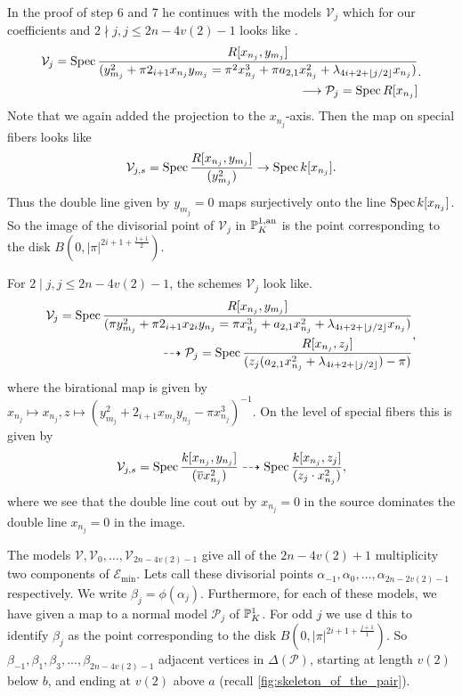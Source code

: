 In the proof of step 6 and 7 he continues with the models $\mathcal{V} _j$ which for our coefficients and $2 \nmid j, j\le 2n - 4v(2) - 1$ looks like . 
\[
	\begin{aligned}
	\mathcal{V} _j = \operatorname{Spec} \frac{R[x_{n_{j}}, y_{m_j}]}{(y_{m_j}^2 + \pi 2_{i + 1} x_{n_j}y_{m_j} = \pi^2 x_{n_j}^3 + \pi a_{2, 1} x_{n_j}^2 + \lambda_{4i + 2 + \left\lfloor j / 2 \right\rfloor} x_{n_j}) } \\ 
	\longrightarrow  \mathcal{P} _{j} = \operatorname{Spec} R[x_{n_j}]
	\end{aligned}
.\] 
Note that we again added the projection to the $x_{n_j}$-axis. 
Then the map on special fibers looks like \[
	\mathcal{V} _{j, s} = \operatorname{Spec} \frac{R[x_{n_j}, y_{m_j}]}{(y_{m_j}^2)} \to \operatorname{Spec} k[x_{n_j}]
.\] 
Thus the double line given by $y_{m_j} = 0$ maps surjectively onto the line $\operatorname{Spec} k[x_{n_j}]$. 
So the image of the divisorial point of $\mathcal{V} _j$ in $\mathbb{P}^{1, \text{an}}_K$ is the point corresponding to the disk $B(0, |\pi|^{2i + 1 + \frac{j + 1}{2}})$. 

For $2 \mid j, j \le 2n - 4v(2) - 1$, the schemes $\mathcal{V} _j$ look like. 
\[
	\begin{aligned}
		\mathcal{V}_j = \operatorname{Spec} \frac{R[x_{n_j},y_{m_j}]}{(\pi y^2_{m_j} + \pi 2_{{i + 1}}x_{2i}y_{n_j} = \pi x_{n_j}^3 + a_{2,1}x_{n_j}^2 + \lambda_{4i + 2 + \left\lfloor j / 2 \right\rfloor} x_{n_j})} \\ \dashrightarrow  \mathcal{P} _{j} =  \operatorname{Spec} \frac{R[ x_{n_j}, z_j]}{(z_j(a_{2,1} x_{n_j}^2 + \lambda_{4i + 2 + \left\lfloor j / 2 \right\rfloor})- \pi)} 
	\end{aligned}
,\]
where the birational map is given by $x_{n_j} \mapsto  x_{n_j}, z \mapsto (y^2_{m_j} + 2_{i + 1 }x_{m_j}y_{n_j} - \pi x_{n_j}^3)^{-1}$. 
On the level of special fibers this is given by \[
	\mathcal{V} _{j, s} = \operatorname{Spec} \frac{k[x_{n_j}, y_{n_j}]}{(\overline{v}x^2_{n_j})} \dashrightarrow \operatorname{Spec} \frac{k[x_{n_j}, z_j]}{(z_j \cdot  x^2_{n_j})}
,\]
where we see that the double line cout out by  $x_{n_j} = 0$ in the source dominates the double line $x_{n_j} = 0$ in the image. 


\bigskip

The models $\mathcal{V} , \mathcal{V} _{0}, \ldots, \mathcal{V} _{2n - 4v(2) - 1}$ give all of the $2n - 4v(2) + 1$ multiplicity two components of  $\mathscr E_\text{min} $. 
Lets call these divisorial points $\alpha_{-1}, \alpha_0, \ldots, \alpha_{2n-2v(2) - 1}$ respectively. 
We write $\beta_j = \phi(\alpha_j)$. 
Furthermore, for each of these models, we have given a map to a normal model $\mathcal{P} _{j}$ of $\mathbb{P}^{1}_{K}$. 
For odd $j$ we use d this to identify $\beta_j$ as the point corresponding to the disk $B(0, |\pi|^{2i + 1 + \frac{j + 1}{1}})$.
So $\beta_{-1}, \beta_1, \beta_{3}, \ldots, \beta_{2n - 4v(2) - 1}$ adjacent vertices in $\Delta(\mathscr P)$, starting at length $v(2)$ below $b$, and ending at $v(2)$ above $a$ (recall \cref{fig:skeleton_of_the_pair}).

